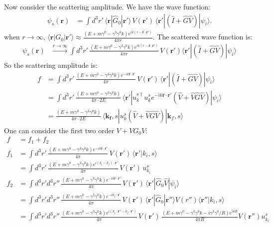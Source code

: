 \documentclass{article}
\numberwithin{equation}{section}
\begin{document}
Now consider the scattering amplitude. We have the wave function:
\begin{align}
    \psi_s(\mathbf{r}) &= \int d^3 r' \, \langle \mathbf{r} | \hat{G}_0 | \mathbf{r}' \rangle \, V(\mathbf{r}') \, \langle \mathbf{r}' | (\hat{I} + \hat{G} \hat{V}) | \psi_i \rangle.
\end{align}
when $r\rightarrow\infty$, $\langle \boldsymbol{r}| G_0 |\boldsymbol{r}'\rangle\approx\frac{(E+m\gamma^0-\gamma^3 \gamma^0 k)e^{ik(r-\hat{\mathbf{r}}\cdot\mathbf{r}')}}{4\pi r}$. The scattered wave function is:
\begin{align}
    \psi_s(\mathbf{r}) &\xrightarrow{r \to \infty}  \int d^3 r' \, \frac{(E+m\gamma^0-\gamma^3 \gamma^0 k)e^{ik(r-\hat{\mathbf{r}}\cdot\mathbf{r}')}}{4\pi r} \, V(\mathbf{r}') \langle \mathbf{r}' | (\hat{I} + \hat{G} \hat{V}) | \psi_i \rangle
\end{align}
So the scattering amplitude is:
\begin{align}
    f&= \int d^3 r' \, \frac{(E+m\gamma^0-\gamma^3 \gamma^0 k)e^{-ik\hat{\mathbf{r}}\cdot\mathbf{r}'}}{4\pi} \, V(\mathbf{r}') \,  \langle \mathbf{r}' | (\hat{I} + \hat{G} \hat{V}) | \psi_i \rangle\nonumber\\
    &= \int d^3 r' \, \frac{(E+m\gamma^0-\gamma^3 \gamma^0 k)}{4\pi\cdot 2E} \,  \langle \mathbf{r}'| u_k^{s\dagger} u_k^s e^{-ik\hat{\mathbf{r}}\cdot\mathbf{r}'}(\hat{V} +\hat{V} \hat{G} \hat{V}) | \psi_i \rangle\nonumber\\
    &= \frac{(E+m\gamma^0-\gamma^3 \gamma^0 k)}{4\pi\cdot 2E} \,  \langle \mathbf{k_f},s| u_k^s (\hat{V} +\hat{V} \hat{G} \hat{V}) | \mathbf{k}_f,s \rangle
\end{align}
One can consider the first two order $V+VG_0V$:
\begin{align}
    f&=f_1+f_2\\
    f_1&=\int d^3 r' \, \frac{(E+m\gamma^0-\gamma^3 \gamma^0 k)e^{-ik\hat{\mathbf{r}}\cdot\mathbf{r}'}}{4\pi} \, V(\mathbf{r}') \,  \langle \mathbf{r}' | k_i,s \rangle\nonumber\\
    &=\int d^3 r' \, \frac{(E+m\gamma^0-\gamma^3 \gamma^0 k)e^{i(k_i-k_f)\cdot\mathbf{r}'}}{4\pi} \, V(\mathbf{r}') \,  u_{k_i}^s\\
    f_2&=\int d^3 r' d^3r''\, \frac{(E+m\gamma^0-\gamma^3 \gamma^0 k)e^{-ik\hat{\mathbf{r}}\cdot\mathbf{r}'}}{4\pi} \, V(\mathbf{r}') \,  \langle \mathbf{r}' |  \hat{G}_0 \hat{V} | \psi_i \rangle\nonumber\\
    &=\int d^3 r' d^3r''\, \frac{(E+m\gamma^0-\gamma^3 \gamma^0 k)e^{-ik_f\cdot\mathbf{r}'}}{4\pi} \, V(\mathbf{r}') \,  \langle \mathbf{r}' |  \hat{G}_0  |\mathbf{r}''\rangle  V(r'') \langle \mathbf{r}'' | k_i, s \rangle\nonumber\\
    &=\int d^3 r' d^3r''\, \frac{(E+m\gamma^0-\gamma^3 \gamma^0 k)e^{i(k_i\cdot\mathbf{r}''-k_f\cdot\mathbf{r}')}}{4\pi} \, V(\mathbf{r}')  \,  \frac{( E + m\gamma^0-\gamma^3 \gamma^0 k-i\gamma^3 \gamma^0/R) e^{ikR}}{4\pi R}V(\mathbf{r}'')  u_{k_i}^s
\end{align}
\end{document}
